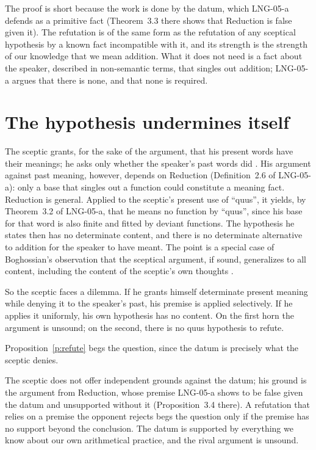 \documentclass{situationist-preprint}
\begin{document}
The proof is short because the work is done by the datum, which LNG-05-a defends as a primitive fact (Theorem~3.3 there shows that Reduction is false given it). The refutation is of the same form as the refutation of any sceptical hypothesis by a known fact incompatible with it, and its strength is the strength of our knowledge that we mean addition. What it does not need is a fact about the speaker, described in non-semantic terms, that singles out addition; LNG-05-a argues that there is none, and that none is required.

\section{The hypothesis undermines itself}

The sceptic grants, for the sake of the argument, that his present words have their meanings; he asks only whether the speaker's past words did \citep{Kripke1982}. His argument against past meaning, however, depends on Reduction (Definition~2.6 of LNG-05-a): only a base that singles out a function could constitute a meaning fact. Reduction is general. Applied to the sceptic's present use of \enquote{quus}, it yields, by Theorem~3.2 of LNG-05-a, that he means no function by \enquote{quus}, since his base for that word is also finite and fitted by deviant functions. The hypothesis he states then has no determinate content, and there is no determinate alternative to addition for the speaker to have meant. The point is a special case of Boghossian's observation that the sceptical argument, if sound, generalizes to all content, including the content of the sceptic's own thoughts \citep{Boghossian1989}.

So the sceptic faces a dilemma. If he grants himself determinate present meaning while denying it to the speaker's past, his premise is applied selectively. If he applies it uniformly, his own hypothesis has no content. On the first horn the argument is unsound; on the second, there is no quus hypothesis to refute.

\begin{objection}
Proposition~\ref{p:refute} begs the question, since the datum is precisely what the sceptic denies.
\end{objection}

\begin{reply}
The sceptic does not offer independent grounds against the datum; his ground is the argument from Reduction, whose premise LNG-05-a shows to be false given the datum and unsupported without it (Proposition~3.4 there). A refutation that relies on a premise the opponent rejects begs the question only if the premise has no support beyond the conclusion. The datum is supported by everything we know about our own arithmetical practice, and the rival argument is unsound.
\end{reply}
\end{document}
